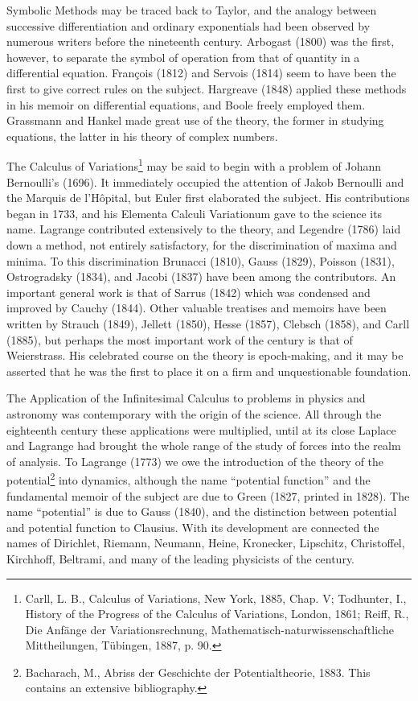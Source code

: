 \documentclass[oneside]{book}
\begin{document}
{Symbolic Methods may be traced back to Taylor, and the analogy
between successive differentiation and ordinary exponentials had
been observed by numerous writers before the nineteenth
century. Arbogast (1800) was the first, however, to separate the
symbol of operation from that of quantity in a differential
equation. Fran\c{c}ois (1812) and Servois (1814) seem to have been
the first to give correct rules on the subject. Hargreave (1848)
applied these methods in his memoir on differential equations, and
Boole freely employed them. Grassmann and Hankel made great use of
the theory, the former in studying equations, the latter in his
theory of complex numbers.

The Calculus of Variations\footnote{Carll, L. B., Calculus of
Variations, New York, 1885, Chap. V; Todhunter, I., History of the
Progress of the Calculus of Variations, London, 1861; Reiff, R., Die
Anf\"ange der Variationsrechnung,
Mathematisch-naturwissenschaftliche Mittheilungen, T\"ubingen,
1887, p. 90.} may be said to begin with a problem of Johann
Bernoulli's (1696). It immediately occupied the attention of Jakob
Bernoulli and the Marquis de l'H\^opital, but Euler first elaborated
the subject. His contributions began in 1733, and his Elementa
Calculi Variationum gave to the science its name. Lagrange
contributed extensively to the theory, and Legendre (1786) laid down
a method, not entirely satisfactory, for the discrimination of
maxima and minima. To this discrimination Brunacci (1810), Gauss
(1829), Poisson (1831), Ostrogradsky (1834), and Jacobi (1837) have
been among the contributors. An important general work is that of
Sarrus (1842) which was condensed and improved by Cauchy
(1844). Other valuable treatises and memoirs have been written by
Strauch (1849), Jellett (1850), Hesse (1857), Clebsch (1858), and
Carll (1885), but perhaps the most important work of the century is
that of Weierstrass. His celebrated course on the theory is
epoch-making, and it may be asserted that he was the first to place
it on a firm and unquestionable foundation.

The Application of the Infinitesimal Calculus to problems in physics
and astronomy was contemporary with the origin of the science. All
through the eighteenth century these applications were multiplied,
until at its close Laplace and Lagrange had brought the whole range
of the study of forces into the realm of analysis. To Lagrange
(1773) we owe the introduction of the theory of the
potential\footnote{Bacharach, M., Abriss der Geschichte der
Potentialtheorie, 1883. This contains an extensive bibliography.}
into dynamics, although the name ``potential function'' and the
fundamental memoir of the subject are due to Green (1827, printed in
1828). The name ``potential'' is due to Gauss (1840), and the
distinction between potential and potential function to
Clausius. With its development are connected the names of Dirichlet,
Riemann, Neumann, Heine, Kronecker, Lipschitz, Christoffel,
Kirchhoff, Beltrami, and many of the leading physicists of the
century.

}
\end{document}
